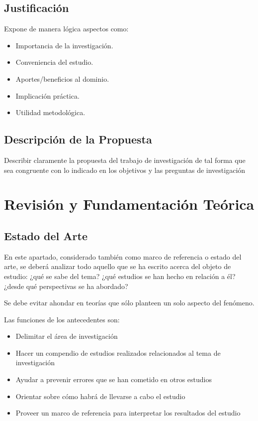 \documentclass[12]{plan_tesis}
\begin{document}
\section{Justificación}
Expone de manera lógica aspectos como:

\begin{itemize}
    \item Importancia de la investigación.
    \item Conveniencia del estudio.
    \item Aportes/beneficios al dominio.
    \item Implicación práctica.
    \item Utilidad metodológica.
\end{itemize}

\section{Descripción de la Propuesta}
Describir claramente la propuesta del trabajo de investigación de tal forma que sea congruente con lo indicado en los objetivos y las preguntas de investigación

\chapter{Revisión y Fundamentación Teórica}

\section{Estado del Arte}
En este apartado, considerado también como marco de referencia o estado del arte, se deberá analizar todo aquello que se ha escrito acerca del objeto de estudio: ¿qué se sabe del tema? ¿qué estudios se han hecho en relación a él? ¿desde qué perspectivas se ha abordado?\newline

Se debe evitar ahondar en teorías que sólo planteen un solo aspecto del fenómeno.\newline

Las funciones de los antecedentes son:

\begin{itemize}
    \item Delimitar el área de investigación
    \item Hacer un compendio de estudios realizados relacionados al tema de investigación
    \item Ayudar a prevenir errores que se han cometido en otros estudios
    \item Orientar sobre cómo habrá de llevarse a cabo el estudio
    \item Proveer un marco de referencia para interpretar los resultados del estudio
\end{itemize}
\end{document}
